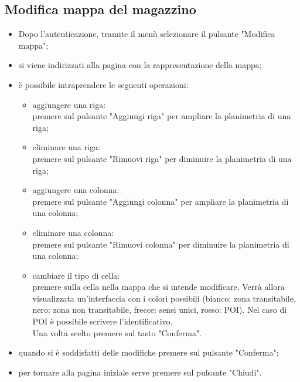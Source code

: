 \subsection{Modifica mappa del magazzino}
\begin{itemize}
    \item Dopo l'autenticazione, tramite il menù selezionare il pulsante "Modifica mappa";
    \item si viene indirizzati alla pagina con la rappresentazione della mappa;
    \item è possibile intraprendere le seguenti operazioni:
        \begin{itemize}
            \item aggiungere una riga: \\premere sul pulsante "Aggiungi riga" per ampliare la planimetria di una riga;
            \item eliminare una riga: \\premere sul pulsante "Rimuovi riga" per diminuire la planimetria di una riga;
            \item aggiungere una colonna: \\premere sul pulsante "Aggiungi colonna" per ampliare la planimetria di una colonna;
            \item eliminare una colonna: \\premere sul pulsante "Rimuovi colonna" per diminuire la planimetria di una colonna;
            \item cambiare il tipo di cella: \\premere sulla cella nella mappa che si intende modificare. Verrà allora visualizzata un'interfaccia con i colori possibili (bianco: zona transitabile, nero: zona non transitabile, frecce: sensi unici, rosso: POI). Nel caso di POI è possibile scrivere l'identificativo. \\Una volta scelto premere sul tasto "Conferma".
        \end{itemize}
    \item quando si è soddisfatti delle modifiche premere sul pulsante "Conferma";
    \item per tornare alla pagina iniziale serve premere sul pulsante "Chiudi".
\end{itemize}
